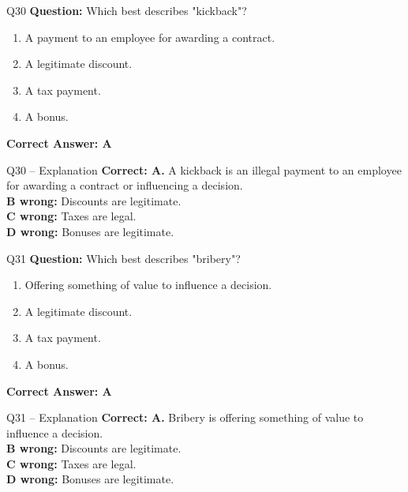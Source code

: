 \documentclass[aspectratio=169,10pt]{beamer}
\begin{document}
	\begin{frame}[t]{Q30}
		\small
		\textbf{Question:} Which best describes "kickback"?
		\begin{enumerate}[label=\Alph*.,itemsep=1pt,topsep=2pt]
			\item A payment to an employee for awarding a contract.
			\item A legitimate discount.
			\item A tax payment.
			\item A bonus.
		\end{enumerate}
		\vspace{4pt}
		\textbf{Correct Answer: A}
	\end{frame}
	
	\begin{frame}[t]{Q30 -- Explanation}
		\small
		\textbf{Correct: A.} A kickback is an illegal payment to an employee for awarding a contract or influencing a decision. \\[4pt]
		\textbf{B wrong:} Discounts are legitimate. \\[2pt]
		\textbf{C wrong:} Taxes are legal. \\[2pt]
		\textbf{D wrong:} Bonuses are legitimate.
	\end{frame}
	
	\begin{frame}[t]{Q31}
		\small
		\textbf{Question:} Which best describes "bribery"?
		\begin{enumerate}[label=\Alph*.,itemsep=1pt,topsep=2pt]
			\item Offering something of value to influence a decision.
			\item A legitimate discount.
			\item A tax payment.
			\item A bonus.
		\end{enumerate}
		\vspace{4pt}
		\textbf{Correct Answer: A}
	\end{frame}
	
	\begin{frame}[t]{Q31 -- Explanation}
		\small
		\textbf{Correct: A.} Bribery is offering something of value to influence a decision. \\[4pt]
		\textbf{B wrong:} Discounts are legitimate. \\[2pt]
		\textbf{C wrong:} Taxes are legal. \\[2pt]
		\textbf{D wrong:} Bonuses are legitimate.
	\end{frame}
	
\end{document}
